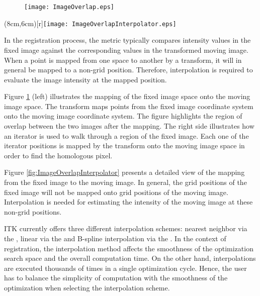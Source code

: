 % 
%

\begin{figure}
\center
\texttt{[image: ImageOverlap.eps]}
\label{fig:ImageOverlapIterator}
\end{figure}


\parpic(8cm,6cm)[r]{\texttt{[image: ImageOverlapInterpolator.eps]}}

In the registration process, the metric typically compares intensity values
in the fixed image against the corresponding values in the transformed moving
image. When a point is mapped from one space to another by a transform, it
will in general be mapped to a non-grid position. Therefore, interpolation is
required to evaluate the image intensity at the mapped position.

Figure \ref{fig:ImageOverlapIterator} (left) illustrates the mapping of the
fixed image space onto the moving image space. The transform maps points from
the fixed image coordinate system onto the moving image coordinate system. The
figure highlights the region of overlap between the two images after the
mapping. The right side illustrates how an iterator is used to walk through a
region of the fixed image. Each one of the iterator positions is mapped by the
transform onto the moving image space in order to find the homologous pixel.

Figure \ref{fig:ImageOverlapInterpolator} presents a detailed view of the
mapping from the fixed image to the moving image. In general, the grid positions
of the fixed image will not be mapped onto grid positions of the moving image.
Interpolation is needed for estimating the intensity of the moving image at
these non-grid positions.


ITK currently offers three different interpolation schemes: nearest neighbor
via the , linear via the
 and B-spline interpolation via the 
. In the context of registration,
the interpolation method affects the smoothness of the optimization search
space and the overall computation time. On the other hand, interpolations are
executed thousands of times in a single optimization cycle. Hence, the user
has to balance the simplicity of computation with the smoothness of the optimization when selecting the interpolation scheme.

